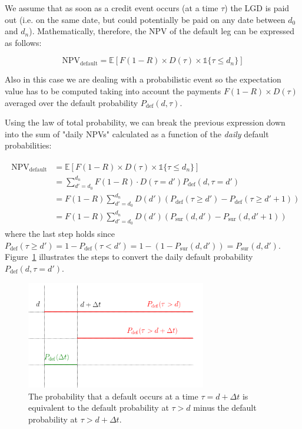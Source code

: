 We assume that as soon as a credit event occurs (at a time $\tau$) the LGD is paid out (i.e. on the same date, but could potentially be paid on any date between $d_0$ and $d_n$). Mathematically, therefore, the NPV of the default leg can be expressed as follows:

\begin{equation}
\mathrm{NPV_{default}} =\mathbb{E}[F(1-R) \times D(\tau) \times \mathbb{1} \{\tau \leq d_n\} ]
\end{equation}

Also in this case we are dealing with a probabilistic event so the expectation value has to be computed taking into account the payments $F(1-R)\times D(\tau)$ averaged over the default probability $P_{\textrm{def}}(d, \tau)$. 

Using the law of total probability, we can break the previous expression down into the sum of "daily NPVs" calculated as a function of the \emph{daily} default probabilities:

\begin{align}
\begin{split}
\mathrm{NPV_{default}} &= \mathbb{E}[F(1-R) \times D(\tau) \times \mathbb{1}\{\tau \leq d_n\} ] \\
&= \sum_{d'=d_0}^{d_n} F(1-R) \cdot D(\tau = d') P_{\textrm{def}}(d, \tau = d') \\
&= F(1-R) \sum_{d'=d_0}^{d_n} D(d') \left(P_{\textrm{def}}(\tau \geq d') - P_{\textrm{def}}( \tau \geq d'+1) \right) \\
&= F(1-R) \sum_{d'=d_0}^{d_n} D(d') \left( P_{\textrm{sur}}(d, d') - P_{\textrm{sur}}(d, d'+1) \right)
\end{split}
\end{align}
where the last step holds since $P_{\textrm{def}}(\tau\geq d') = 1 - P_{\textrm{def}}(\tau < d') = 1 - (1-P_{\textrm{sur}}(d, d')) = P_{\textrm{sur}}(d, d')$. 
Figure~\ref{fig:default_p} illustrates the steps to convert the daily default probability $P_{\textrm{def}}(d, \tau=d')$.

\begin{figure}[htb]
\centering
\includegraphics[width=0.7\textwidth]{figures/timeline.png}
\caption{The probability that a default occurs at a time $\tau = d+\Delta t$ is equivalent to the default probability at $\tau > d$ minus the default probability at $\tau>d+\Delta t$.}
\label{fig:default_p}
\end{figure}

